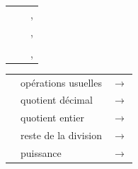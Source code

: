 \noindent
\begin{minipage}[t]{0.41\linewidth}\vspace{0pt}
{\renewcommand{\arraystretch}{1.45}%
\begin{tabularx}{\linewidth}{@{}llY@{}}
\toprule
{} &  &  \\
\midrule
{} &  & ,  \\
 &  & ,  \\
 &  &  \\
 &  & ,  \\
\bottomrule
\end{tabularx}}
\end{minipage}\hfill
\begin{minipage}[t]{0.54\linewidth}\vspace{0pt}
{\renewcommand{\arraystretch}{1.45}%
\begin{tabularx}{\linewidth}{@{}lYl@{}}
\toprule
{} &  &  \\
\midrule
\code{+}\enspace\code{-}\enspace\code{*} & opérations usuelles &  $\to$  \\
\code{/} & quotient décimal &  $\to$  \\
\code{//} & quotient entier &  $\to$  \\
\code{\%} & reste de la division &  $\to$  \\
\code{**} & puissance &  $\to$  \\
\bottomrule
\end{tabularx}}
\end{minipage}


